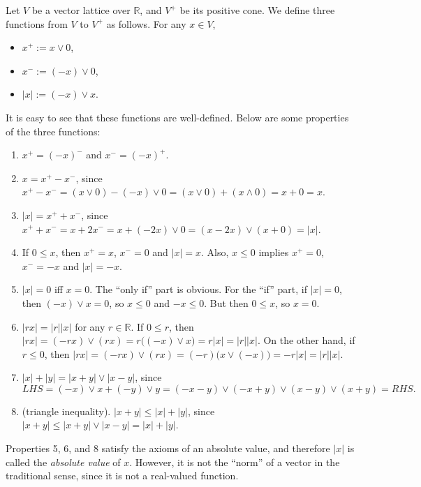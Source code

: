\documentclass[12pt]{article}
\begin{document}
Let $V$ be a vector lattice over $\mathbb{R}$, and $V^+$ be its positive cone.  We define three functions from $V$ to $V^+$ as follows.  For any $x\in V$,
\begin{itemize}
\item $x^+:=x\vee 0$,
\item $x^-:=(-x)\vee 0$, 
\item $|x|:=(-x)\vee x$.
\end{itemize}

It is easy to see that these functions are well-defined.  Below are some properties of the three functions:
\begin{enumerate}
\item $x^+=(-x)^-$ and $x^-=(-x)^+$.
\item $x=x^+-x^-$, since $x^+-x^-=(x\vee 0)-(-x)\vee 0=(x\vee 0)+(x\wedge 0)=x+0=x$.
\item $|x|=x^++x^-$, since $x^++x^-=x+2x^-=x+(-2x)\vee 0=(x-2x)\vee (x+0)=|x|$.
\item If $0\le x$, then $x^+=x$, $x^-=0$ and $|x|=x$.  Also, $x\le 0$ implies $x^+=0$, $x^-=-x$ and $|x|=-x$.
\item $|x|=0$ iff $x=0$.  The ``only if'' part is obvious.  For the ``if'' part, if $|x|=0$, then $(-x)\vee x=0$, so $x\le 0$ and $-x\le 0$.  But then $0\le x$, so $x=0$.
\item $|rx|=|r||x|$ for any $r\in \mathbb{R}$.  If $0\le r$, then $|rx|=(-rx)\vee (rx)=r\big((-x)\vee x\big)=r|x|=|r||x|$.  On the other hand, if $r\le 0$, then $|rx|=(-rx)\vee (rx)=(-r)\big(x\vee (-x)\big)=-r|x|=|r||x|$.
\item $|x|+|y|=|x+y|\vee |x-y|$, since $$LHS=(-x)\vee x+(-y)\vee y=(-x-y)\vee (-x+y)\vee (x-y)\vee (x+y)=RHS.$$
\item (triangle inequality). $|x+y|\le |x|+|y|$, since $|x+y|\le |x+y|\vee |x-y|=|x|+|y|$.
\end{enumerate}

Properties 5, 6, and 8 satisfy the axioms of an absolute value, and therefore $|x|$ is called the \emph{absolute value} of $x$.  However, it is not the ``norm'' of a vector in the traditional sense, since it is not a real-valued function.
\end{document}
